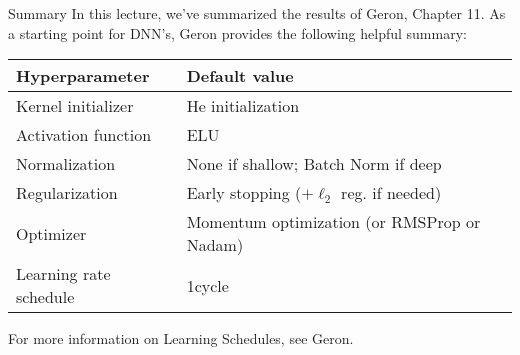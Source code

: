 \documentclass[10pt, table, dvipsnames,xcdraw,handout]{beamer}
\begin{document}
\begin{frame}[fragile]{Summary}
In this lecture, we've summarized the results of Geron, Chapter 11. As a starting point for DNN's, Geron provides the following helpful summary:

\begin{center}
\begin{table}[]
\begin{tabular}{ll}
Hyperparameter &  Default value \\ \hline
Kernel initializer & He initialization\\
Activation function & ELU\\
Normalization & None if shallow; Batch Norm if deep\\
Regularization & Early stopping ($+\ell_2$ reg. if needed)\\
Optimizer & Momentum optimization (or RMSProp or Nadam)\\
Learning rate schedule & 1cycle
\end{tabular}
\end{table}
\end{center}
For more information on Learning Schedules, see Geron. 
\end{frame}
\end{document}
